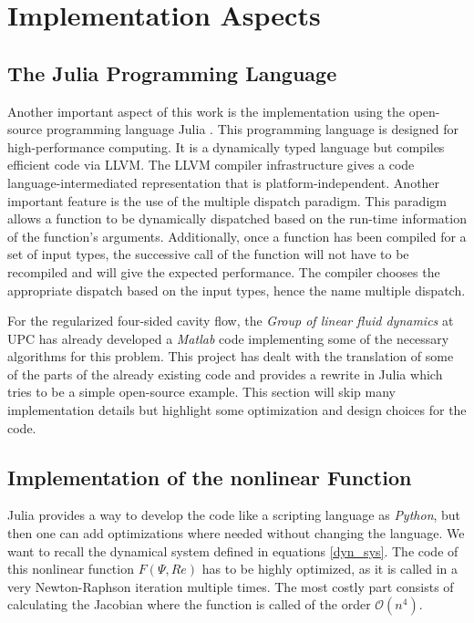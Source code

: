 
\section{Implementation Aspects}

\subsection{The Julia Programming Language}

Another important aspect of this work is the implementation using the
open-source programming language Julia \citep{bezanson2017}. This programming
language is designed for high-performance computing. It is a dynamically typed
language but compiles efficient code via LLVM. The LLVM compiler infrastructure
gives a code language-intermediated representation that is
platform-independent. Another important feature is the use of the multiple
dispatch paradigm. This paradigm allows a function to be dynamically dispatched
based on the run-time information of the function's arguments. Additionally,
once a function has been compiled for a set of input types, the successive call
of the function will not have to be recompiled and will give the expected
performance. The compiler chooses the appropriate dispatch based on the input
types, hence the name multiple dispatch.

For the regularized four-sided cavity flow, the \emph{Group of linear fluid
dynamics} at UPC has already developed a \emph{Matlab} code implementing some
of the necessary algorithms for this problem. This project has dealt with the
translation of some of the parts of the already existing code and provides a
rewrite in Julia which tries to be a simple open-source example. This section
will skip many implementation details but highlight some optimization and
design choices for the code.

\subsection{Implementation of the nonlinear Function}

Julia provides a way to develop the code like a scripting language as
\emph{Python}, but then one can add optimizations where needed without
changing the language. We want to recall the dynamical system defined in
equations \eqref{dyn_sys}. The code of this nonlinear function $F(\Psi, Re)$
has to be highly optimized, as it is called in a very Newton-Raphson
iteration multiple times. The most costly part consists of calculating the
Jacobian where the function is called of the order $\mathcal{O}(n^4)$.

